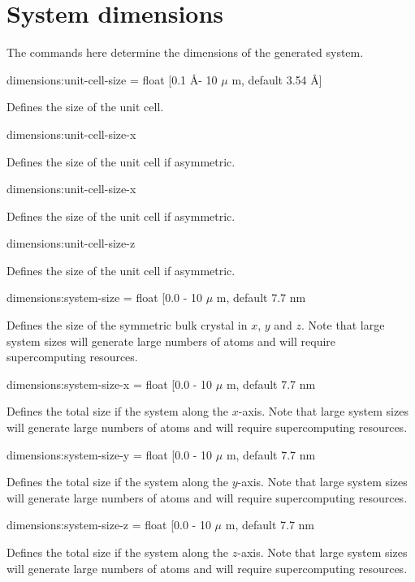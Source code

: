 \section*{System dimensions} The commands here determine the dimensions of the generated system.

{\zicf dimensions:unit-cell-size = float [0.1 \AA - 10 $\mu$ m, default 3.54 \AA]} Defines the size of the unit cell.

{\zicf dimensions:unit-cell-size-x} Defines the size of the unit cell if asymmetric.

{\zicf dimensions:unit-cell-size-x} Defines the size of the unit cell if asymmetric.

{\zicf dimensions:unit-cell-size-z} Defines the size of the unit cell if asymmetric.

{\zicf dimensions:system-size = float [0.0 - 10 $\mu$ m, default 7.7 nm}
Defines the size of the symmetric bulk crystal in $x$, $y$ and $z$. Note that
large system sizes will generate large numbers of atoms and will require
supercomputing resources.

{\zicf dimensions:system-size-x = float [0.0 - 10 $\mu$ m, default 7.7 nm}
Defines the total size if the system along the $x$-axis. Note that
large system sizes will generate large numbers of atoms and will require
supercomputing resources.

{\zicf dimensions:system-size-y = float [0.0 - 10 $\mu$ m, default 7.7 nm}
Defines the total size if the system along the $y$-axis. Note that
large system sizes will generate large numbers of atoms and will require
supercomputing resources.

{\zicf dimensions:system-size-z = float [0.0 - 10 $\mu$ m, default 7.7 nm}
Defines the total size if the system along the $z$-axis. Note that
large system sizes will generate large numbers of atoms and will require
supercomputing resources.

